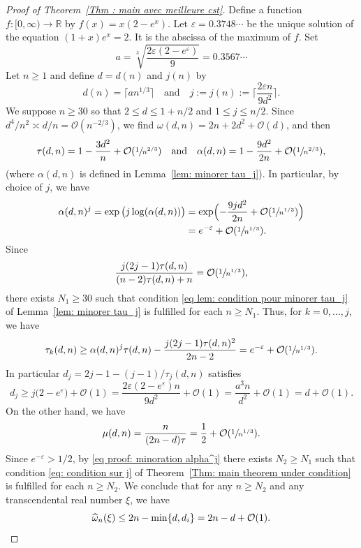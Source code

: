 \documentclass[JEP,XML,SOM,Unicode,NoFloatCountersInSection,published]{cedram}
\newcommand\bR{\mathbb{R}}
\newcommand\ee{\varepsilon}
\newcommand\GrO{\mathcal{O}}
\newcommand\homega{\widehat{\omega}}\newcommand\HH{\mathcal{H}}
\newcommand\AND{\quad\text{and}\quad}
\theoremstyle{definition}
\theoremstyle{plain}
\begin{document}
\begin{proof}[Proof of Theorem~\ref{Thm : main avec meilleure cst}]
Define a function $f:[0,\infty)\to \bR$ by $f(x) = x(2-e^x)$. Let $\ee = 0.3748\cdots$ be the unique solution of the equation $(1+x)e^x = 2$. It is the abscissa of the maximum of $f$. Set
\begin{equation*}
a = \sqrt[3]{\frac{2\ee(2-e^\ee)}{9}} = 0.3567\cdots
\end{equation*}
Let $n\geq 1$ and define $d=d(n)$ and $j(n)$ by
\begin{equation*}
d(n) = \lceil a n^{1/3} \rceil \AND j:=j(n):= \bigg\lceil \frac{2\ee n}{9d^2} \bigg\rceil.
\end{equation*}
We suppose $n \geq 30$ so that $2 \leq d \leq 1+n/2$ and $1\leq j\leq n/2$. Since $d^4/n^2 \asymp d/n = \GrO(n^{-2/3})$, we find $\omega(d,n) = 2n+2d^2 + \GrO(d)$, and then
\begin{equation*}
\tau(d,n) = 1-\frac{3d^2}{n} +\GrO(\sfrac{1}{n^{2/3}}) \AND \alpha(d,n) = 1-\frac{9d^2}{2n} +\GrO(\sfrac{1}{n^{2/3}}),
\end{equation*}
(where $\alpha(d,n)$ is defined in Lemma~\ref{lem: minorer tau_j}). In particular, by choice of $j$, we have
\begin{equation}
\begin{aligned}
\label{eq proof: minoration alpha^j}
\alpha(d,n)^j = \exp\big(j\log(\alpha(d,n))\big) & = \exp\Bigl(-\frac{9jd^2}{2n} +\GrO(\sfrac{1}{n^{1/3}}) \Bigr)\\
& = e^{-\ee} + \GrO(\sfrac{1}{n^{1/3}}).
\end{aligned}
\end{equation}
Since
\[
\frac{j(2j-1)\tau(d,n)}{(n-2)\tau(d,n)+n} = \GrO(\sfrac{1}{n^{1/3}}),
\]
there exists $N_1\geq 30$ such that condition \eqref{eq lem: condition pour minorer tau_j} of Lemma~\ref{lem: minorer tau_j} is fulfilled for each $n\geq N_1$. Thus, for $k=0,\dots,j$, we have
\begin{equation*}
\tau_k(d,n) \geq \alpha(d,n)^j\tau(d,n) - \frac{j(2j-1)\tau(d,n)^2}{2n-2} = e^{-\ee} + \GrO(\sfrac{1}{n^{1/3}}).
\end{equation*}
In particular $d_j = 2j-1-(j-1)/\tau_j(d,n)$ satisfies
\begin{equation*}
d_j \geq j\big(2- e^{\ee}\big) + \GrO(1) = \frac{2\ee(2- e^{\ee}) n}{9d^2} + \GrO(1) = \frac{a^3 n}{d^2} + \GrO(1) = d + \GrO(1).
\end{equation*}
On the other hand, we have
\begin{equation*}
\mu(d,n) = \frac{n}{(2n-d)\tau} = \frac{1}{2}+\GrO(\sfrac{1}{n^{1/3}}).
\end{equation*}
Since $e^{-\ee} > 1/2$, by \eqref{eq proof: minoration alpha^j} there exists $N_2\geq N_1$ such that condition \eqref{eq: condition sur j} of Theorem~\ref{Thm: main theorem under condition} is fulfilled for each $n\geq N_2$. We conclude that for any $n\geq N_2$ and any transcendental real number $\xi$, we have
\begin{equation*}
\homega_n(\xi) \leq 2n-\min\{d,d_i\} = 2n - d + \GrO(1).\qedhere
\end{equation*}
\end{proof}
\end{document}
